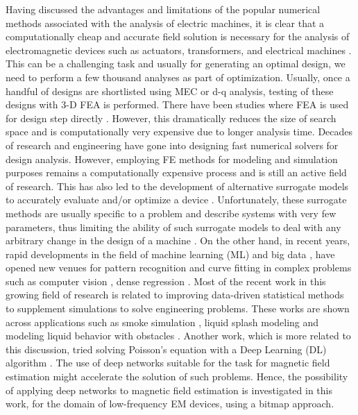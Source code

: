 Having discussed the advantages and limitations of the popular numerical methods associated with the analysis of electric machines, it is clear that a computationally cheap and accurate field solution is necessary for the analysis of electromagnetic devices such as actuators, transformers, and electrical machines \parencite{yilmaz2008capabilities, silva2018surrogate, silva2017surrogate}. This can be a challenging task and usually for generating an optimal design, we need to perform a few thousand analyses as part of optimization. Usually, once a handful of designs are shortlisted using MEC or d-q analysis, testing of these designs with 3-D FEA is performed. There have been studies where FEA is used for design step directly \parencite{bianchi1998design,salon1995finite}. However, this dramatically reduces the size of search space and is computationally very expensive due to longer analysis time.
Decades of research and engineering have gone into designing fast numerical solvers for design analysis. However, employing FE methods for modeling and simulation purposes remains a computationally expensive process and is still an active field of research. This has also led to the development of alternative surrogate models to accurately evaluate and/or optimize a device \parencite{silva2018surrogate, silva2017surrogate, wang2016neural, ghorbanian2017computer, ghorbanian2017statistical}. Unfortunately, these surrogate methods are usually specific to a problem and describe systems with very few parameters, thus limiting the ability of such surrogate models to deal with any arbitrary change in the design of a machine \parencite{silva2017surrogate}. On the other hand, in recent years, rapid developments in the field of machine learning (ML) and big data \parencite{krizhevsky2012imagenet}, have opened new venues for pattern recognition and curve fitting in complex problems such as computer vision \parencite{krizhevsky2012imagenet, he2016deep}, dense regression \parencite{badrinarayanan2015segnet}. Most of the recent work in this growing field of research is related to improving data-driven statistical methods to supplement simulations to solve engineering problems. These works are shown across applications such as smoke simulation \parencite{chu2017data}, liquid splash modeling \parencite{um2018liquid} and modeling liquid behavior with obstacles \parencite{tompson2017accelerating}. Another work, which is more related to this discussion, tried solving Poisson’s equation with a Deep Learning (DL) algorithm \parencite{tang2017study}. The use of deep networks suitable for the task for magnetic field estimation might accelerate the solution of such problems. Hence, the possibility of applying deep networks to magnetic field estimation is investigated in this work, for the domain of low-frequency EM devices, using a bitmap approach.

